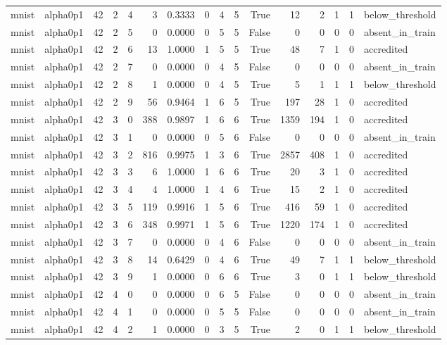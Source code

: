 \begin{tabular}{llrrrrrrrrrrrrrl}
mnist & alpha0p1 & 42 & 2 & 4 & 3 & 0.3333 & 0 & 4 & 5 & True & 12 & 2 & 1 & 1 & below\_threshold \\
mnist & alpha0p1 & 42 & 2 & 5 & 0 & 0.0000 & 0 & 5 & 5 & False & 0 & 0 & 0 & 0 & absent\_in\_train \\
mnist & alpha0p1 & 42 & 2 & 6 & 13 & 1.0000 & 1 & 5 & 5 & True & 48 & 7 & 1 & 0 & accredited \\
mnist & alpha0p1 & 42 & 2 & 7 & 0 & 0.0000 & 0 & 4 & 5 & False & 0 & 0 & 0 & 0 & absent\_in\_train \\
mnist & alpha0p1 & 42 & 2 & 8 & 1 & 0.0000 & 0 & 4 & 5 & True & 5 & 1 & 1 & 1 & below\_threshold \\
mnist & alpha0p1 & 42 & 2 & 9 & 56 & 0.9464 & 1 & 6 & 5 & True & 197 & 28 & 1 & 0 & accredited \\
mnist & alpha0p1 & 42 & 3 & 0 & 388 & 0.9897 & 1 & 6 & 6 & True & 1359 & 194 & 1 & 0 & accredited \\
mnist & alpha0p1 & 42 & 3 & 1 & 0 & 0.0000 & 0 & 5 & 6 & False & 0 & 0 & 0 & 0 & absent\_in\_train \\
mnist & alpha0p1 & 42 & 3 & 2 & 816 & 0.9975 & 1 & 3 & 6 & True & 2857 & 408 & 1 & 0 & accredited \\
mnist & alpha0p1 & 42 & 3 & 3 & 6 & 1.0000 & 1 & 6 & 6 & True & 20 & 3 & 1 & 0 & accredited \\
mnist & alpha0p1 & 42 & 3 & 4 & 4 & 1.0000 & 1 & 4 & 6 & True & 15 & 2 & 1 & 0 & accredited \\
mnist & alpha0p1 & 42 & 3 & 5 & 119 & 0.9916 & 1 & 5 & 6 & True & 416 & 59 & 1 & 0 & accredited \\
mnist & alpha0p1 & 42 & 3 & 6 & 348 & 0.9971 & 1 & 5 & 6 & True & 1220 & 174 & 1 & 0 & accredited \\
mnist & alpha0p1 & 42 & 3 & 7 & 0 & 0.0000 & 0 & 4 & 6 & False & 0 & 0 & 0 & 0 & absent\_in\_train \\
mnist & alpha0p1 & 42 & 3 & 8 & 14 & 0.6429 & 0 & 4 & 6 & True & 49 & 7 & 1 & 1 & below\_threshold \\
mnist & alpha0p1 & 42 & 3 & 9 & 1 & 0.0000 & 0 & 6 & 6 & True & 3 & 0 & 1 & 1 & below\_threshold \\
mnist & alpha0p1 & 42 & 4 & 0 & 0 & 0.0000 & 0 & 6 & 5 & False & 0 & 0 & 0 & 0 & absent\_in\_train \\
mnist & alpha0p1 & 42 & 4 & 1 & 0 & 0.0000 & 0 & 5 & 5 & False & 0 & 0 & 0 & 0 & absent\_in\_train \\
mnist & alpha0p1 & 42 & 4 & 2 & 1 & 0.0000 & 0 & 3 & 5 & True & 2 & 0 & 1 & 1 & below\_threshold \\

\end{tabular}
